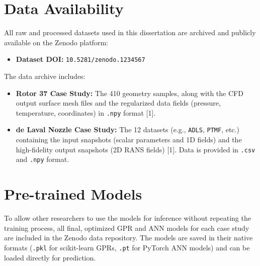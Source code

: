 \documentclass[dsc, EN]{ufabcFHZh}
\begin{document}
\section{Data Availability}
\label{sec:data_availability}

All raw and processed datasets used in this dissertation are archived and publicly available on the Zenodo platform:
\begin{itemize}
    \item \textbf{Dataset DOI:} \texttt{10.5281/zenodo.1234567}
\end{itemize}
The data archive includes:
\begin{itemize}
    \item \textbf{Rotor 37 Case Study:} The 410 geometry samples, along with the CFD output surface mesh files and the regularized data fields (pressure, temperature, coordinates) in \texttt{.npy} format {[1]}.
    \item \textbf{de Laval Nozzle Case Study:} The 12 datasets (e.g., \texttt{ADLS}, \texttt{PTMF}, etc.) containing the input snapshots (scalar parameters and 1D fields) and the high-fidelity output snapshots (2D RANS fields) {[1]}. Data is provided in \texttt{.csv} and \texttt{.npy} format.
\end{itemize}

\section{Pre-trained Models}
\label{sec:models_availability}

To allow other researchers to use the models for inference without repeating the training process, all final, optimized GPR and ANN models for each case study are included in the Zenodo data repository. The models are saved in their native formats (\texttt{.pkl} for scikit-learn GPRs, \texttt{.pt} for PyTorch ANN models) and can be loaded directly for prediction.
\end{document}
